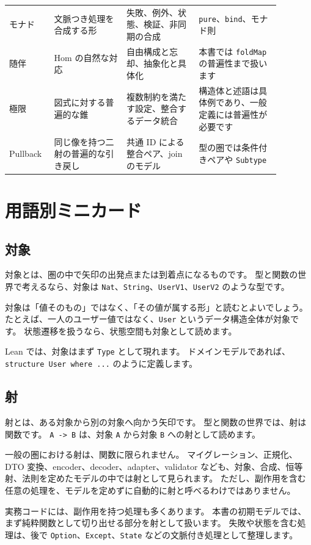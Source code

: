 \begin{longtable}{@{}p{0.13\linewidth}p{0.24\linewidth}p{0.24\linewidth}p{0.27\linewidth}@{}}
モナド & 文脈つき処理を合成する形 & 失敗、例外、状態、検証、非同期の合成 & \texttt{pure}、\texttt{bind}、モナド則 \\
随伴 & Hom の自然な対応 & 自由構成と忘却、抽象化と具体化 & 本書では \texttt{foldMap} の普遍性まで扱います \\
極限 & 図式に対する普遍的な錐 & 複数制約を満たす設定、整合するデータ統合 & 構造体と述語は具体例であり、一般定義には普遍性が必要です \\
Pullback & 同じ像を持つ二射の普遍的な引き戻し & 共通 ID による整合ペア、join のモデル & 型の圏では条件付きペアや \texttt{Subtype} \\
\bottomrule
\end{longtable}
\endgroup

\section{用語別ミニカード}

\subsection{対象}

対象とは、圏の中で矢印の出発点または到着点になるものです。
型と関数の世界で考えるなら、対象は \texttt{Nat}、\texttt{String}、\texttt{UserV1}、\texttt{UserV2} のような型です。

対象は「値そのもの」ではなく、「その値が属する形」と読むとよいでしょう。
たとえば、一人のユーザー値ではなく、\texttt{User} というデータ構造全体が対象です。
状態遷移を扱うなら、状態空間も対象として読めます。

Lean では、対象はまず \texttt{Type} として現れます。
ドメインモデルであれば、\texttt{structure User where ...} のように定義します。

\subsection{射}

射とは、ある対象から別の対象へ向かう矢印です。
型と関数の世界では、射は関数です。
\texttt{A -> B} は、対象 \texttt{A} から対象 \texttt{B} への射として読めます。

一般の圏における射は、関数に限られません。
マイグレーション、正規化、DTO 変換、encoder、decoder、adapter、validator なども、対象、合成、恒等射、法則を定めたモデルの中では射として見られます。
ただし、副作用を含む任意の処理を、モデルを定めずに自動的に射と呼べるわけではありません。

実務コードには、副作用を持つ処理も多くあります。
本書の初期モデルでは、まず純粋関数として切り出せる部分を射として扱います。
失敗や状態を含む処理は、後で \texttt{Option}、\texttt{Except}、\texttt{State} などの文脈付き処理として整理します。

